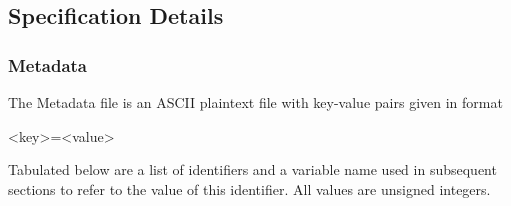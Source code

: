 \documentclass{article}
\begin{document}
\subsection{Specification Details}

\subsubsection{Metadata}
The Metadata file is an ASCII plaintext file with key-value pairs given in format
\begin{center}
\textless key\textgreater\space=\space\textless value\textgreater 
\end{center}
Tabulated below are a list of identifiers and a variable name used in subsequent sections to refer to the value of this identifier. All values are unsigned integers.
\end{document}
